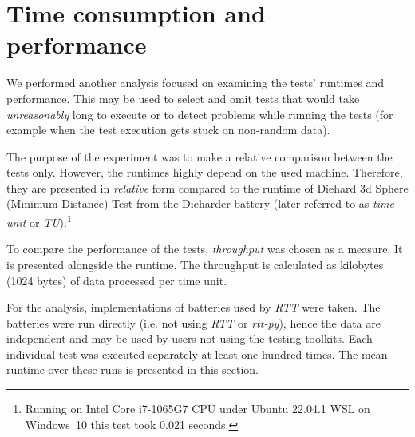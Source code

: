 \documentclass[
  digital,     %
  oneside,     %
  nosansbold,  %
  nocolorbold, %
  nolof,         %
  nolot,         %
]{fithesis4}
\begin{document}



\section{Time consumption and performance} \label{chap:analysis-times}


We performed another analysis focused on examining the tests' runtimes and performance. This may be used to select and omit tests that would take \emph{unreasonably} long to execute or to detect problems while running the tests (for example when the test execution gets stuck on non-random data).

The purpose of the experiment was to make a relative comparison between the tests only. However, the runtimes highly depend on the used machine. Therefore, they are presented in \emph{relative} form compared to the runtime of Diehard 3d Sphere (Minimum Distance) Test from the Dieharder battery (later referred to as \emph{time unit} or \emph{TU}).\footnote{Running on Intel Core i7-1065G7 CPU under Ubuntu 22.04.1 WSL on Windows~10 this test took 0.021 seconds.}


To compare the performance of the tests, \emph{throughput} was chosen as a measure. It is presented alongside the runtime. The throughput is calculated as kilobytes (1024 bytes) of data processed per time unit. 

For the analysis, implementations of batteries used by \emph{RTT} \cite{rtt-batteries} were taken. The batteries were run directly (i.e. not using \emph{RTT} or \emph{rtt-py}), hence the data are independent and may be used by users not using the testing toolkits. Each individual test was executed separately at least one hundred times. The mean runtime over these runs is presented in this section.
\end{document}
